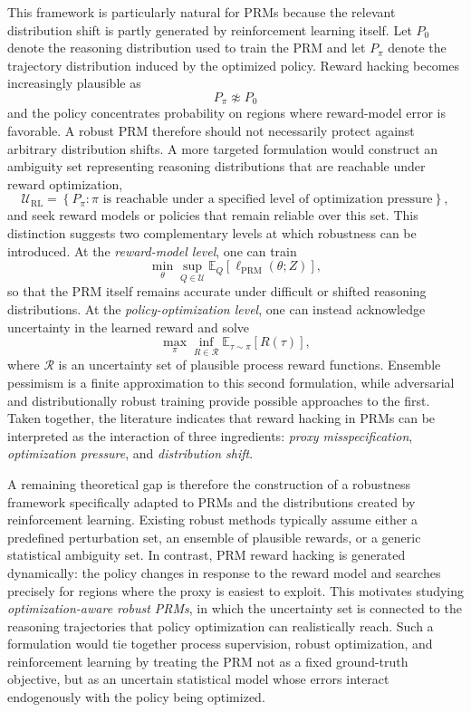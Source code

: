 \documentclass[11pt]{article}
\begin{document}
This framework is particularly natural for PRMs because the relevant distribution shift is partly generated by reinforcement learning itself. Let $P_0$ denote the reasoning distribution used to train the PRM and let $P_{\pi}$ denote the trajectory distribution induced by the optimized policy. Reward hacking becomes increasingly plausible as
\[
P_{\pi}
\not\approx
P_0
\]
and the policy concentrates probability on regions where reward-model error is favorable. A robust PRM therefore should not necessarily protect against arbitrary distribution shifts. A more targeted formulation would construct an ambiguity set representing reasoning distributions that are reachable under reward optimization,
\[
\mathcal{U}_{\mathrm{RL}}
=
\left\{
P_{\pi} :
\pi
\text{ is reachable under a specified level of optimization pressure}
\right\},
\]
and seek reward models or policies that remain reliable over this set.
This distinction suggests two complementary levels at which robustness can be introduced. At the \emph{reward-model level}, one can train
\[
\min_{\theta}
\sup_{Q\in\mathcal{U}}
\mathbb{E}_{Q}
\left[
\ell_{\mathrm{PRM}}(\theta;Z)
\right],
\]
so that the PRM itself remains accurate under difficult or shifted reasoning distributions. At the \emph{policy-optimization level}, one can instead acknowledge uncertainty in the learned reward and solve
\[
\max_{\pi}
\inf_{R\in\mathcal{R}}
\mathbb{E}_{\tau\sim\pi}
\left[
R(\tau)
\right],
\]
where $\mathcal{R}$ is an uncertainty set of plausible process reward functions. Ensemble pessimism is a finite approximation to this second formulation, while adversarial and distributionally robust training provide possible approaches to the first.
Taken together, the literature indicates that reward hacking in PRMs can be interpreted as the interaction of three ingredients: \emph{proxy misspecification}, \emph{optimization pressure}, and \emph{distribution shift}. 

A remaining theoretical gap is therefore the construction of a robustness framework specifically adapted to PRMs and the distributions created by reinforcement learning. Existing robust methods typically assume either a predefined perturbation set, an ensemble of plausible rewards, or a generic statistical ambiguity set. In contrast, PRM reward hacking is generated dynamically: the policy changes in response to the reward model and searches precisely for regions where the proxy is easiest to exploit. This motivates studying \emph{optimization-aware robust PRMs}, in which the uncertainty set is connected to the reasoning trajectories that policy optimization can realistically reach. Such a formulation would tie together process supervision, robust optimization, and reinforcement learning by treating the PRM not as a fixed ground-truth objective, but as an uncertain statistical model whose errors interact endogenously with the policy being optimized.
\end{document}
